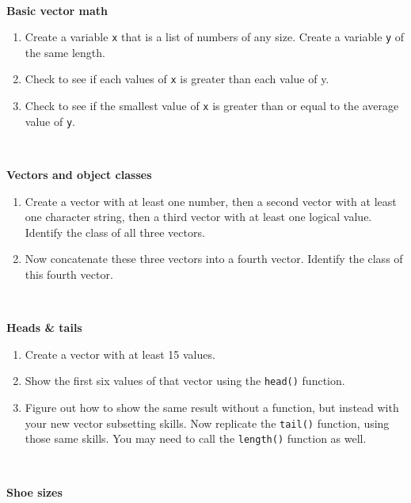 \documentclass[
]{book}
\begin{document}
~

\textbf{Basic vector math}

\begin{enumerate}
\def\labelenumi{\arabic{enumi}.}
\setcounter{enumi}{4}
\item
  Create a variable \texttt{x} that is a list of numbers of any size. Create a variable \texttt{y} of the same length.
\item
  Check to see if each values of \texttt{x} is greater than each value of y.
\item
  Check to see if the smallest value of \texttt{x} is greater than or equal to the average value of \texttt{y}.
\end{enumerate}

~

\textbf{Vectors and object classes}

\begin{enumerate}
\def\labelenumi{\arabic{enumi}.}
\setcounter{enumi}{7}
\item
  Create a vector with at least one number, then a second vector with at least one character string, then a third vector with at least one logical value. Identify the class of all three vectors.
\item
  Now concatenate these three vectors into a fourth vector. Identify the class of this fourth vector.
\end{enumerate}

~

\textbf{Heads \& tails}

\begin{enumerate}
\def\labelenumi{\arabic{enumi}.}
\setcounter{enumi}{9}
\item
  Create a vector with at least 15 values.
\item
  Show the first six values of that vector using the \texttt{head()} function.
\item
  Figure out how to show the same result without a function, but instead with your new vector subsetting skills.
  Now replicate the \texttt{tail()} function, using those same skills. You may need to call the \texttt{length()} function as well.
\end{enumerate}

~

\textbf{Shoe sizes}
\end{document}
